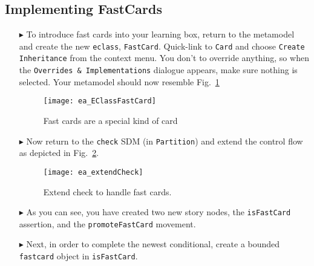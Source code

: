 \newpage
\subsection{Implementing FastCards}
\visHeader
\hypertarget{fastCard vis}{}

\begin{itemize}

\item[$\blacktriangleright$] To introduce fast cards into your learning box, return to the metamodel and create the new \texttt{eclass}, \texttt{FastCard}.
Quick-link to \texttt{Card} and choose \texttt{Create Inheritance} from the context menu. You don't to override anything, so
when the \texttt{Overrides \& Implementations} dialogue appears, make sure nothing is selected. Your metamodel should now resemble
Fig.~\ref{fig:metamodel_FastCard}

\vspace{0.5cm}

\begin{figure}[htp]
\begin{center}
  \texttt{[image: ea\_EClassFastCard]}
  \caption{Fast cards are a special kind of card}  
  \label{fig:metamodel_FastCard}
\end{center}
\end{figure}

\vspace{0.5cm}

\item[$\blacktriangleright$] Now return to the \texttt{check} SDM (in \texttt{Partition}) and extend the control flow as depicted in
Fig.~\ref{fig:extendCheck}.

\begin{figure}[htbp]
\begin{center}
  \texttt{[image: ea\_extendCheck]}
  \caption{Extend check to handle fast cards.}  
  \label{fig:extendCheck}
\end{center}
\end{figure}
 
 \vspace{0.5cm}
 
\item[$\blacktriangleright$] As you can see, you have created two new story nodes, the \texttt{isFastCard} assertion, and the \texttt{promoteFastCard} movement.

\vspace{0.5cm}
 
\item[$\blacktriangleright$] Next, in order to complete the newest conditional, create a bounded \texttt{fastcard} object in \texttt{isFastCard}. 


\end{itemize}
